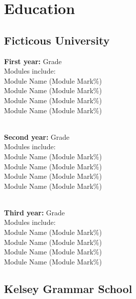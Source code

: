 \section{Education} 

    \subsection{Ficticous University}


        \sectionspace %
        \textbf{First year:} Grade \\
        Modules include: \\
        Module Name (Module Mark\%)\\
        Module Name (Module Mark\%)\\
        Module Name (Module Mark\%)\\
        Module Name (Module Mark\%)\\
        \sectionspace %

        \\\textbf{Second year:} Grade \\
        Modules include: \\
        Module Name (Module Mark\%)\\
        Module Name (Module Mark\%)\\
        Module Name (Module Mark\%)\\
        Module Name (Module Mark\%)\\
        \sectionspace %

        \\\textbf{Third year:} Grade \\
        Modules include: \\
        Module Name (Module Mark\%)\\
        Module Name (Module Mark\%)\\
        Module Name (Module Mark\%)\\
        Module Name (Module Mark\%)\\
        \vspace %
        \sectionspace
        \sectionspace

    \subsection{Kelsey Grammar School}

